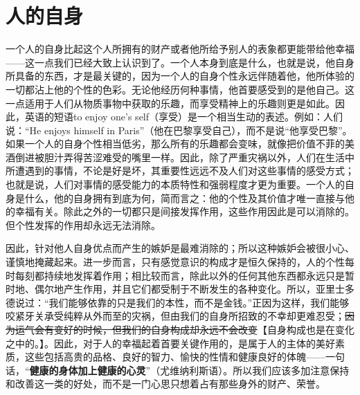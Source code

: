 \documentclass[12pt,oneside]{book}
\begin{document}
  

\chapter{人的自身} 
一个人的自身比起这个人所拥有的财产或者他所给予别人的表象都更能带给他幸福——这一点我们已经大致上认识到了。一个人本身到底是什么，也就是说，他自身所具备的东西，才是最关键的，因为一个人的自身个性永远伴随着他，他所体验的一切都沾上他的个性的色彩。无论他经历何种事情，他首要感受到的是他自己。这一点适用于人们从物质事物中获取的乐趣，而享受精神上的乐趣则更是如此。因此，英语的短语to enjoy one's self（享受）是一个相当生动的表述。例如：人们说：“He enjoys himself in Paris”（他在巴黎享受自己），而不是说“他享受巴黎”。如果一个人的自身个性相当低劣，那么所有的乐趣都会变味，就像把价值不菲的美酒倒进被胆汁弄得苦涩难受的嘴里一样。因此，除了严重灾祸以外，人们在生活中所遭遇到的事情，不论是好是坏，其重要性远远不及人们对这些事情的感受方式；也就是说，人们对事情的感受能力的本质特性和强弱程度才更为重要。一个人的自身是什么，他的自身拥有到底为何，简而言之：他的个性及其价值才唯一直接与他的幸福有关。除此之外的一切都只是间接发挥作用，这些作用因此是可以消除的。但个性发挥的作用却永远无法消除。

因此，针对他人自身优点而产生的嫉妒是最难消除的；所以这种嫉妒会被很小心、谨慎地掩藏起来。进一步而言，只有感觉意识的构成才是恒久保持的，人的个性每时每刻都持续地发挥着作用；相比较而言，除此以外的任何其他东西都永远只是暂时地、偶尔地产生作用，并且它们都受制于不断发生的各种变化。所以，亚里士多德说过：“我们能够依靠的只是我们的本性，而不是金钱。”正因为这样，我们能够咬紧牙关承受纯粹从外而至的灾祸，但由我们的自身所招致的不幸却更难忍受；\sout{因为运气会有变好的时候，但我们的自身构成却永远不会改变}【自身构成也是在变化之中的。】。因此，对于人的幸福起着首要关键作用的，是属于人的主体的美好素质，这些包括高贵的品格、良好的智力、愉快的性情和健康良好的体魄——一句话，“\textbf{健康的身体加上健康的心灵}”（尤维纳利斯语）。所以我们应该多加注意保持和改善这一类的好处，而不是一门心思只想着占有那些身外的财产、荣誉。 
\end{document}
